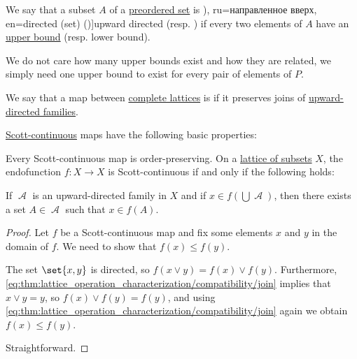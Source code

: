 \begin{definition}\label{def:directed_set}
  We say that a subset \( A \) of a \hyperref[def:preordered_set]{preordered set} is \term[bg=насочено надясно (множество) (\cite[10]{Проданов1982}), ru=направленное вверх, en=directed (set) (\cite[332]{PicadoPultr2012})]{upward directed} (resp. ) if every two elements of \( A \) have an \hyperref[def:extremal_points/bounds]{upper bound} (resp. lower bound).
\end{definition}
\begin{comments}
  \item We do not care how many upper bounds exist and how they are related, we simply need one upper bound to exist for every pair of elements of \( P \).
\end{comments}

\begin{definition}\label{def:scott_continuity}
  We say that a map between \hyperref[def:complete_lattice]{complete lattices} is  if it preserves joins of \hyperref[def:directed_set]{upward-directed families}.
\end{definition}

\begin{proposition}\label{thm:def:scott_continuous}
  \hyperref[def:scott_continuity]{Scott-continuous} maps have the following basic properties:
  \begin{thmenum}
     Every Scott-continuous map is order-preserving.
     On a \hyperref[thm:boolean_algebra_of_subsets]{lattice of subsets} \( X \), the endofunction \( f: X \to X \) is Scott-continuous if and only if the following holds:
    \begin{displayquote}
      If \( \mscrA \) is an upward-directed family in \( X \) and if \( x \in f(\bigcup \mscrA) \), then there exists a set \( A \in \mscrA \) such that \( x \in f(A) \).
    \end{displayquote}
  \end{thmenum}
\end{proposition}
\begin{proof}
   Let \( f \) be a Scott-continuous map and fix some elements \( x \) and \( y \) in the domain of \( f \). We need to show that \( f(x) \leq f(y) \).

  The set \( \set{ x, y } \) is directed, so \( f(x \vee y) = f(x) \vee f(y) \). Furthermore, \eqref{eq:thm:lattice_operation_characterization/compatibility/join} implies that \( x \vee y = y \), so \( f(x) \vee f(y) = f(y) \), and using \eqref{eq:thm:lattice_operation_characterization/compatibility/join} again we obtain \( f(x) \leq f(y) \).

   Straightforward.
\end{proof}

